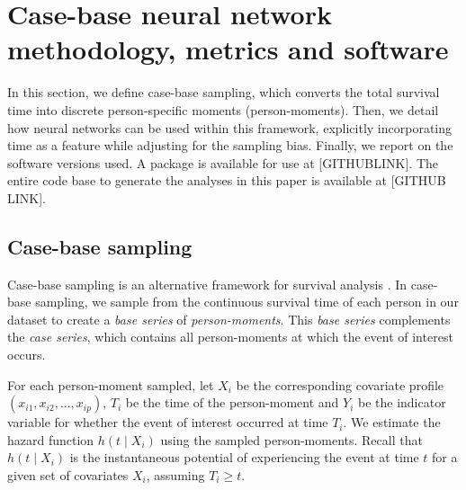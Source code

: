 \documentclass[AMA,STIX1COL,]{WileyNJD-v2}
\begin{document}
\hypertarget{methods}{%
\section{Case-base neural network methodology, metrics and
software}\label{methods}}

In this section, we define case-base sampling, which converts the total
survival time into discrete person-specific moments (person-moments).
Then, we detail how neural networks can be used within this framework,
explicitly incorporating time as a feature while adjusting for the
sampling bias. Finally, we report on the software versions used. A
package is available for use at {[}GITHUBLINK{]}. The entire code base
to generate the analyses in this paper is available at {[}GITHUB
LINK{]}.

\hypertarget{case-base-sampling}{%
\subsection{Case-base sampling}\label{case-base-sampling}}

Case-base sampling is an alternative framework for survival analysis
\citep{hanley2009}. In case-base sampling, we sample from the continuous
survival time of each person in our dataset to create a \emph{base
series} of \emph{person-moments}. This \emph{base series} complements
the \emph{case series}, which contains all person-moments at which the
event of interest occurs.

For each person-moment sampled, let \(X_i\) be the corresponding
covariate profile \(\left(x_{i1},x_{i2},...,x_{ip} \right)\), \(T_i\) be
the time of the person-moment and \(Y_i\) be the indicator variable for
whether the event of interest occurred at time \(T_i\). We estimate the
hazard function \(h(t \mid X_i)\) using the sampled person-moments.
Recall that \(h(t \mid X_i)\) is the instantaneous potential of
experiencing the event at time \(t\) for a given set of covariates
\(X_i\), assuming \(T_i \geq t\).
\end{document}
